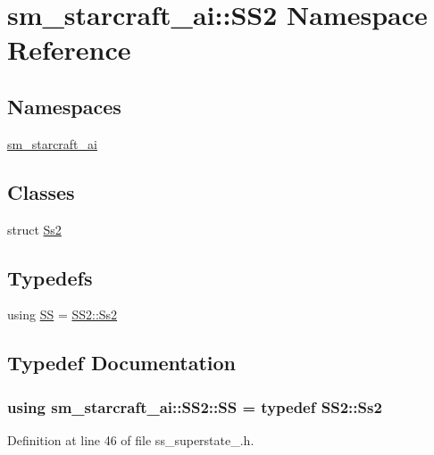 \hypertarget{namespacesm__starcraft__ai_1_1SS2}{}\section{sm\+\_\+starcraft\+\_\+ai\+:\+:S\+S2 Namespace Reference}
\label{namespacesm__starcraft__ai_1_1SS2}
\subsection*{Namespaces}
\begin{DoxyCompactItemize}
\item 
 \hyperlink{namespacesm__starcraft__ai_1_1SS2_1_1sm__starcraft__ai}{sm\+\_\+starcraft\+\_\+ai}
\end{DoxyCompactItemize}
\subsection*{Classes}
\begin{DoxyCompactItemize}
\item 
struct \hyperlink{structsm__starcraft__ai_1_1SS2_1_1Ss2}{Ss2}
\end{DoxyCompactItemize}
\subsection*{Typedefs}
\begin{DoxyCompactItemize}
\item 
using \hyperlink{namespacesm__starcraft__ai_1_1SS2_ade16df8f7552107f5a7ea90002aba80c}{SS} = \hyperlink{structsm__starcraft__ai_1_1SS2_1_1Ss2}{S\+S2\+::\+Ss2}
\end{DoxyCompactItemize}


\subsection{Typedef Documentation}
\subsubsection[{\texorpdfstring{SS}{SS}}]{\setlength{\rightskip}{0pt plus 5cm}using {\bf sm\+\_\+starcraft\+\_\+ai\+::\+S\+S2\+::\+SS} = typedef {\bf S\+S2\+::\+Ss2}}\hypertarget{namespacesm__starcraft__ai_1_1SS2_ade16df8f7552107f5a7ea90002aba80c}{}\label{namespacesm__starcraft__ai_1_1SS2_ade16df8f7552107f5a7ea90002aba80c}


Definition at line 46 of file ss\+\_\+superstate\+\_.\+h.

